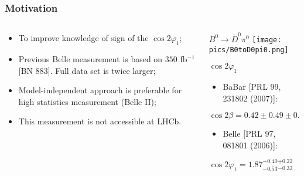 \documentclass[10 pt,compress,mathserif]{beamer}
\newcommand{\bdpi}{\ensuremath{B^0\to \bar D^0\pi^0}\xspace}
\begin{document}
\begin{frame}
 \frametitle{Motivation}
 \begin{columns}
  \begin{column}{0.5\textwidth}
   \begin{itemize}
    \item To improve knowledge of sign of the $\cos2\varphi_1$;
    \item Previous Belle measurement is based on $350$ fb${}^{-1}$ [BN 883]. Full data set is twice larger;
    \item Model-independent approach is preferable for high statistics measurement (Belle II);
    \item This measurement is not accessible at LHCb.
   \end{itemize}

  \end{column}
  \begin{column}{0.5\textwidth}
  \begin{block}{\bdpi}
   \texttt{[image: pics/B0toD0pi0.png]}
  \end{block}
  
  \begin{block}{$\cos2\varphi_1$}
   \begin{itemize}
    \item BaBar {\small [PRL 99, 231802 (2007)]}:
   \end{itemize}
  
   $\cos2\beta = 0.42 \pm 0.49 \pm 0.09 \pm 0.13$
   
   \begin{itemize}
    \item Belle {\small [PRL 97, 081801 (2006)]}:
   \end{itemize}

   $\cos2\varphi_1 = 1.87^{+0.40}_{-0.53}{}^{+0.22}_{-0.32}$
  \end{block}

  \end{column}
 \end{columns}
\end{frame}
\end{document}
